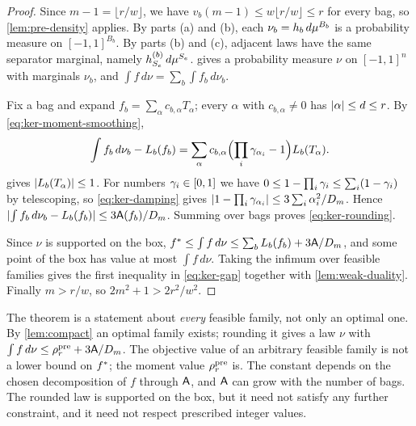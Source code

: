 \begin{proof}
Since $m-1=\lfloor r/w\rfloor$, we have $v_b(m-1)\le w\lfloor r/w\rfloor\le r$
for every bag, so \cref{lem:pre-density} applies. By parts (a) and (b), each
$\nu_b=h_b\,d\mu^{B_b}$ is a probability measure on $[-1,1]^{B_b}$. By
parts (b) and (c), adjacent laws have the same separator marginal, namely
$h^{(b)}_{S_e}\,d\mu^{S_e}$.  gives a probability measure
$\nu$ on $[-1,1]^n$ with marginals $\nu_b$, and
$\int f\,d\nu=\sum_b\int f_b\,d\nu_b$.

Fix a bag and expand $f_b=\sum_\alpha c_{b,\alpha}T_\alpha$; every
$\alpha$ with $c_{b,\alpha}\ne0$ has $\lvert \alpha\rvert\le d\le r$. By
\eqref{eq:ker-moment-smoothing},
\[
  \int f_b\,d\nu_b-L_b(f_b)=\sum_\alpha c_{b,\alpha}
  \Bigl(\prod_i\gamma_{\alpha_i}-1\Bigr)L_b(T_\alpha).
\]
 gives $\lvert L_b(T_\alpha)\rvert\le1$. For numbers
$\gamma_i\in[0,1]$ we have $0\le1-\prod_i\gamma_i\le\sum_i(1-\gamma_i)$ by
telescoping, so \eqref{eq:ker-damping} gives
$\lvert 1-\prod_i\gamma_{\alpha_i}\rvert\le3\sum_i\alpha_i^2/D_m$. Hence
$\lvert \int f_b\,d\nu_b-L_b(f_b)\rvert\le3\mathsf{A}(f_b)/D_m$. Summing over bags proves
\eqref{eq:ker-rounding}.

Since $\nu$ is supported on the box, $f^{*}\le\int f\,d\nu\le
\sum_bL_b(f_b)+3\mathsf{A}/D_m$, and some point of the box has value at most
$\int f\,d\nu$. Taking the infimum over feasible families gives the first
inequality in \eqref{eq:ker-gap} together with
\cref{lem:weak-duality}. Finally $m>r/w$, so $2m^2+1>2r^2/w^2$.
\end{proof}

The theorem is a statement about \emph{every} feasible family, not only an
optimal one. By \cref{lem:compact} an optimal family exists; rounding it
gives a law $\nu$ with $\int f\,d\nu\le\rho^{\mathrm{pre}}_r+3\mathsf{A}/D_m$. The objective
value of an arbitrary feasible family is not a lower bound on $f^{*}$; the
moment value $\rho^{\mathrm{pre}}_r$ is. The constant depends on the chosen
decomposition of $f$ through $\mathsf{A}$, and $\mathsf{A}$ can grow with the number
of bags. The rounded law is supported on the box, but it need not satisfy
any further constraint, and it need not respect prescribed integer values.

